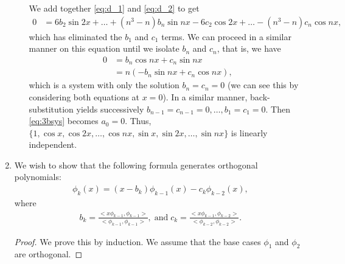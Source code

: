 \documentclass[10pt]{article}
\begin{document}
\begin{enumerate}
\begin{enumerate}
    We add together \eqref{eq:d_1} and \eqref{eq:d_2} to get \begin{align*}
        0 &= 6b_2\sin 2x + \dots + (n^3-n)b_n\sin  nx - 6c_2\cos 2x + \dots - (n^3-n)c_n \cos  nx,
    \end{align*} which has eliminated the \(b_1\) and \(c_1\) terms. We can proceed in a similar manner on this equation until we isolate \(b_n\) and \(c_n\), that is, we have \begin{align*}
        0 &= b_n \cos  nx + c_n \sin  nx \\
          &= n\left(-b_n \sin  nx + c_n \cos  nx\right),
    \end{align*} which is a system with only the solution \(b_n = c_n = 0\) (we can see this by considering both equations at \(x = 0\)). In a similar manner, back-substitution yields successively \(b_{n-1} = c_{n-1} = 0, \dots , b_1 = c_1 = 0\). Then \eqref{eq:3bsys} becomes \(a_0 = 0\). Thus, \(\{1, \cos  x, \cos  2x, \dots , \cos  nx, \sin  x, \sin  2x, \dots , \sin  nx\}\) is linearly independent.

  \end{enumerate}

  \newpage
  \item We wish to show that the following formula generates orthogonal polynomials: \begin{align}\label{eq:ortho_rec}
    \phi_k(x) = (x-b_k)\phi _{k-1}(x) - c_k \phi _{k-2}(x),
  \end{align} where \begin{align*}
      b_k = \frac{<x\phi _{k-1}, \phi _{k-1}>}{<\phi _{k-1}, \phi _{k-1}>},\;\mathrm{and}\;c_k = \frac{<x\phi _{k-1}, \phi _{k-2}>}{<\phi _{k-2}, \phi _{k-2}>}.
  \end{align*}

  \begin{proof} We prove this by induction. We assume that the base cases \(\phi_1\) and \(\phi _2\) are orthogonal.
    

\end{proof}
\end{enumerate}
\end{document}
